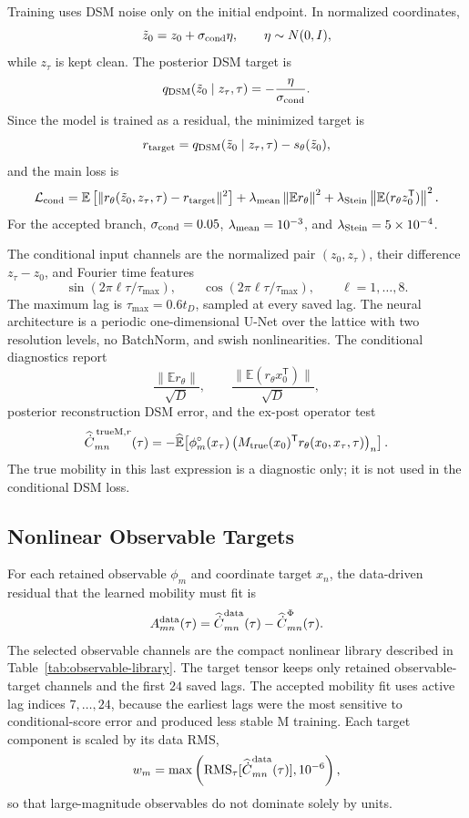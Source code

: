 \documentclass[11pt]{article}
\newcommand{\E}{\mathbb{E}}
\newcommand{\T}{\mathsf{T}}
\begin{document}
Training uses DSM noise only on the initial endpoint.  In normalized
coordinates,
\[
  \tilde z_0=z_0+\sigma_{\rm cond}\eta,\qquad \eta\sim N(0,I),
\]
while $z_\tau$ is kept clean.  The posterior DSM target is
\[
  q_{\rm DSM}(\tilde z_0\mid z_\tau,\tau)
  =
  -\frac{\eta}{\sigma_{\rm cond}} .
\]
Since the model is trained as a residual, the minimized target is
\[
  r_{\rm target}
  =
  q_{\rm DSM}(\tilde z_0\mid z_\tau,\tau)
  -
  s_\theta(\tilde z_0),
\]
and the main loss is
\[
  \mathcal L_{\rm cond}
  =
  \E\left[
    \|r_\theta(\tilde z_0,z_\tau,\tau)-r_{\rm target}\|^2
  \right]
  +
  \lambda_{\rm mean}\left\|\E r_\theta\right\|^2
  +
  \lambda_{\rm Stein}\left\|\E(r_\theta z_0^\T)\right\|^2 .
\]
For the accepted branch, $\sigma_{\rm cond}=0.05$,
$\lambda_{\rm mean}=10^{-3}$, and $\lambda_{\rm Stein}=5\times10^{-4}$.

The conditional input channels are the normalized pair
$(z_0,z_\tau)$, their difference $z_\tau-z_0$, and Fourier time features
\[
  \sin(2\pi\ell \tau/\tau_{\max}),\qquad
  \cos(2\pi\ell \tau/\tau_{\max}),\qquad
  \ell=1,\ldots,8.
\]
The maximum lag is $\tau_{\max}=0.6t_D$, sampled at every saved lag.  The neural
architecture is a periodic one-dimensional U-Net over the lattice with two
resolution levels, no BatchNorm, and swish nonlinearities.  The conditional
diagnostics report
\[
  \frac{\|\E r_\theta\|}{\sqrt D},\qquad
  \frac{\|\E(r_\theta x_0^\T)\|}{\sqrt D},
\]
posterior reconstruction DSM error, and the ex-post operator test
\[
  \widehat{\dot C}_{mn}^{\,{\rm trueM},r}(\tau)
  =
  -
  \widehat{\E}\!\left[
    \phi_m^\circ(x_\tau)
    \left(M_{\rm true}(x_0)^\T r_\theta(x_0,x_\tau,\tau)\right)_n
  \right].
\]
The true mobility in this last expression is a diagnostic only; it is not used
in the conditional DSM loss.

\subsection{Nonlinear Observable Targets}

For each retained observable $\phi_m$ and coordinate target $x_n$, the
data-driven residual that the learned mobility must fit is
\[
  A_{mn}^{\rm data}(\tau)
  =
  \widehat{\dot C}_{mn}^{\rm data}(\tau)
  -
  \widehat{\dot C}_{mn}^{\Phi}(\tau).
\]
The selected observable channels are the compact nonlinear library described in
Table~\ref{tab:observable-library}.  The target tensor keeps only retained
observable-target channels and the first $24$ saved lags.  The accepted mobility
fit uses active lag indices $7,\ldots,24$, because the earliest lags were the
most sensitive to conditional-score error and produced less stable M training.
Each target component is scaled by its data RMS,
\[
  w_m=\max\left({\rm RMS}_\tau[\widehat{\dot C}_{mn}^{\rm data}(\tau)],10^{-6}\right),
\]
so that large-magnitude observables do not dominate solely by units.
\end{document}
